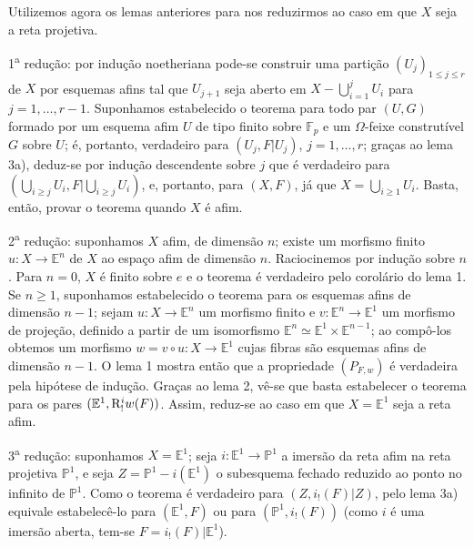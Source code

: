 Utilizemos agora os lemas anteriores para nos reduzirmos ao caso em que $X$ seja a reta projetiva.

1\textsuperscript{a} redução: por indução noetheriana pode-se construir uma partição $(U_j)_{1\le j\le r}$ de $X$ por esquemas afins tal que $U_{j+1}$ seja aberto em $X-\bigcup_{i=1}^jU_i$ para $j=1,\ldots,r-1$. Suponhamos estabelecido o teorema para todo par $(U,G)$ formado por um esquema afim $U$ de tipo finito sobre $\mathbb F_p$ e um $\Omega$-feixe construtível $G$ sobre $U$; é, portanto, verdadeiro para $(U_j,F|U_j)$, $j=1,\ldots,r$; graças ao lema 3a), deduz-se por indução descendente sobre $j$ que é verdadeiro para $(\bigcup_{i\ge j}U_i,F|\bigcup_{i\ge j}U_i)$, e, portanto, para $(X,F)$, já que $X=\bigcup_{i\ge1}U_i$. Basta, então, provar o teorema quando $X$ é afim.

2\textsuperscript{a} redução: suponhamos $X$ afim, de dimensão $n$; existe um morfismo finito $u:X\to\mathbb E^n$ de $X$ ao espaço afim de dimensão $n$. Raciocinemos por indução sobre $n$. Para $n=0$, $X$ é finito sobre $e$ e o teorema é verdadeiro pelo corolário do lema 1. Se $n\ge1$, suponhamos estabelecido o teorema para os esquemas afins de dimensão $n-1$; sejam $u:X\to\mathbb E^n$ um morfismo finito e $v:\mathbb E^n\to\mathbb E^1$ um morfismo de projeção, definido a partir de um isomorfismo $\mathbb E^n\simeq\mathbb E^1\times\mathbb E^{n-1}$; ao compô-los obtemos um morfismo $w=v\circ u:X\to\mathbb E^1$ cujas fibras são esquemas afins de dimensão $n-1$. O lema 1 mostra então que a propriedade $(P_{F,w})$ é verdadeira pela hipótese de indução. Graças ao lema 2, vê-se que basta estabelecer o teorema para os pares $(\mathbb E^1,\mathrm{R}^i_!w(F))$. Assim, reduz-se ao caso em que $X=\mathbb E^1$ seja a reta afim.

3\textsuperscript{a} redução: suponhamos $X=\mathbb E^1$; seja $i:\mathbb E^1\to\mathbb P^1$ a imersão da reta afim na reta projetiva $\mathbb P^1$, e seja $Z=\mathbb P^1-i(\mathbb E^1)$ o subesquema fechado reduzido ao ponto no infinito de $\mathbb P^1$. Como o teorema é verdadeiro para $(Z,i_!(F)|Z)$, pelo lema 3a) equivale estabelecê-lo para $(\mathbb E^1,F)$ ou para $(\mathbb P^1,i_!(F))$ (como $i$ é uma imersão aberta, tem-se $F=i_!(F)|\mathbb E^1$).
